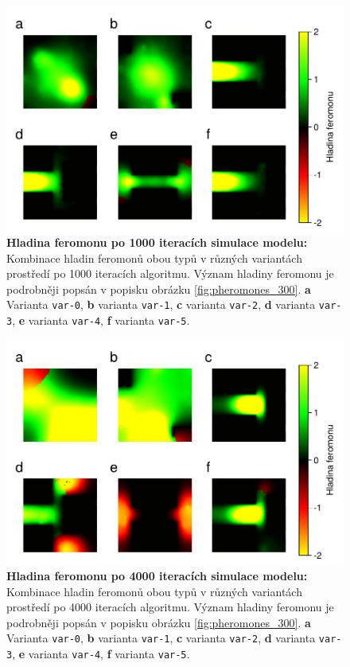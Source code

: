 \documentclass[10pt,a4paper,twocolumn]{article}
\begin{document}
\begin{figure}[tb]
  \centering
  \includegraphics[width=0.98\linewidth]{images/pheromone_levels_1000.pdf}
  \caption{\textbf{Hladina feromonu po 1000 iteracích simulace modelu:} 
  Kombinace hladin feromonů obou typů v různých variantách prostředí 
  po 1000 iteracích algoritmu. Význam hladiny feromonu je podrobněji
  popsán v popisku obrázku \ref{fig:pheromones_300}.
  \textbf{a} Varianta \texttt{var-0}, 
  \textbf{b} varianta \texttt{var-1},
  \textbf{c} varianta \texttt{var-2},
  \textbf{d} varianta \texttt{var-3},
  \textbf{e} varianta \texttt{var-4},
  \textbf{f} varianta \texttt{var-5}.}
  \label{fig:pheromones_1000}
\end{figure}

\begin{figure}[tb]
  \centering
  \includegraphics[width=0.98\linewidth]{images/pheromone_levels_4000.pdf}
  \caption{\textbf{Hladina feromonu po 4000 iteracích simulace modelu:} 
  Kombinace hladin feromonů obou typů v různých variantách prostředí 
  po 4000 iteracích algoritmu. Význam hladiny feromonu je podrobněji
  popsán v popisku obrázku \ref{fig:pheromones_300}.
  \textbf{a} Varianta \texttt{var-0}, 
  \textbf{b} varianta \texttt{var-1},
  \textbf{c} varianta \texttt{var-2},
  \textbf{d} varianta \texttt{var-3},
  \textbf{e} varianta \texttt{var-4},
  \textbf{f} varianta \texttt{var-5}.}
  \label{fig:pheromones_4000}
\end{figure}
\end{document}
